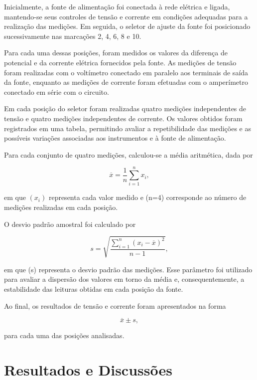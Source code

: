 \documentclass[a4paper,12pt]{article}
\begin{document}
Inicialmente, a fonte de alimentação foi conectada à rede elétrica e ligada, mantendo-se seus controles de tensão e corrente em condições adequadas para a realização das medições. Em seguida, o seletor de ajuste da fonte foi posicionado sucessivamente nas marcações 2, 4, 6, 8 e 10.

Para cada uma dessas posições, foram medidos os valores da diferença de potencial e da corrente elétrica fornecidos pela fonte. As medições de tensão foram realizadas com o voltímetro conectado em paralelo aos terminais de saída da fonte, enquanto as medições de corrente foram efetuadas com o amperímetro conectado em série com o circuito.

Em cada posição do seletor foram realizadas quatro medições independentes de tensão e quatro medições independentes de corrente. Os valores obtidos foram registrados em uma tabela, permitindo avaliar a repetibilidade das medições e as possíveis variações associadas aos instrumentos e à fonte de alimentação.

Para cada conjunto de quatro medições, calculou-se a média aritmética, dada por

\begin{equation}
\overline{x}
=
\frac{1}{n}
\sum_{i=1}^{n} x_i,
\label{eq:media_medidas}
\end{equation}

em que $(x_i)$ representa cada valor medido e (n=4) corresponde ao número de medições realizadas em cada posição.

O desvio padrão amostral foi calculado por

\begin{equation}
s
=
\sqrt{
\frac{
\displaystyle\sum_{i=1}^{n}
\left(x_i-\overline{x}\right)^2
}{n-1}
},
\label{eq:desvio_padrao_medidas}
\end{equation}

em que (s) representa o desvio padrão das medições. Esse parâmetro foi utilizado para avaliar a dispersão dos valores em torno da média e, consequentemente, a estabilidade das leituras obtidas em cada posição da fonte.

Ao final, os resultados de tensão e corrente foram apresentados na forma

\[
\overline{x} \pm s,
\]

para cada uma das posições analisadas.

\section{Resultados e Discussões}
\end{document}
